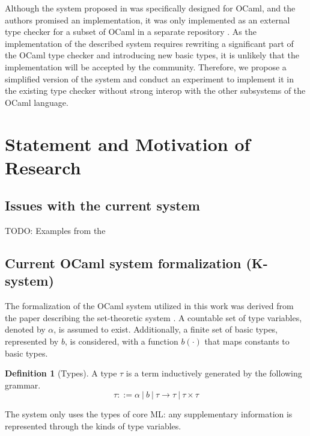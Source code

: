 \documentclass[a4paper,11pt,oneside]{article}
\theoremstyle{definition}
\newtheorem{defsec}{Definition}[section]
\begin{document}
Although the system proposed in \cite{Castagna_2016} was specifically designed
for OCaml, and the authors promised an implementation, it was only implemented
as an external type checker for a subset of OCaml in a separate repository
\cite{setvariants}. As the implementation of the described system requires
rewriting a significant part of the OCaml type checker and introducing new basic
types, it is unlikely that the implementation will be accepted by the community.
Therefore, we propose a simplified version of the system and conduct an experiment
to implement it in the existing type checker without strong interop with the other
subsystems of the OCaml language.

\section{Statement and Motivation of Research}

\subsection{Issues with the current system}

TODO: Examples from the \cite{Castagna_2016}

\subsection{Current OCaml system formalization (K-system)}

The formalization of the OCaml system utilized in this work was
derived from the paper describing the set-theoretic system \cite{Castagna_2016}.
A countable set of type variables, denoted by $\alpha$, is assumed to exist.
Additionally, a finite set of basic types, represented by $b$, is considered,
with a function $b(\cdot)$ that maps constants to basic types.

\begin{defsec}[Types]
  A type $\tau$ is a term inductively generated by the following grammar.
  $$ \tau ::= \alpha\ |\ b\ |\ \tau \rightarrow \tau\ |\ \tau \times \tau $$
\end{defsec}

The system only uses the types of core ML: any supplementary information
is represented through the kinds of type variables.
\end{document}
